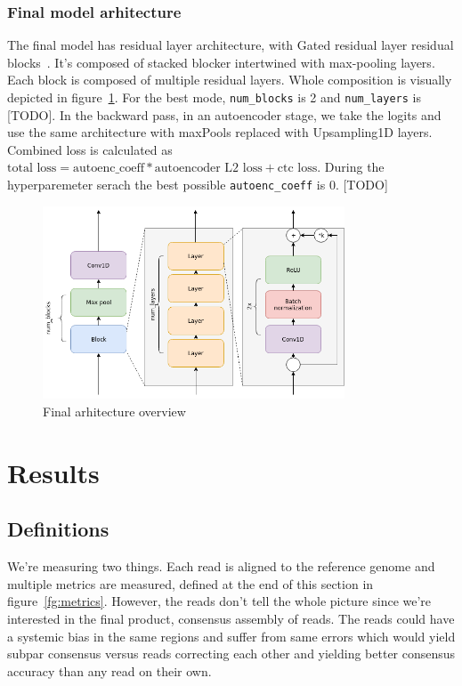 \documentclass[times, utf8, diplomski, english]{fer}
\begin{document}
\subsection{Final model arhitecture}
\label{subsec:final-model-architecture}

The final model has residual layer architecture, with Gated residual layer residual blocks~\citep{resnet,DBLP:journals/corr/Savarese16}. 
It's composed of stacked blocker intertwined with max-pooling layers.
Each block is composed of multiple residual layers. 
Whole composition is visually depicted in figure~\ref{fg:final_arch}.
For the best mode, \texttt{num\_blocks} is 2 and \texttt{num\_layers} is [TODO].
In the backward pass, in an autoencoder stage, we take the logits and use the same architecture with maxPools replaced with Upsampling1D layers.
Combined loss is calculated as $\text{total loss} = \text{autoenc\_coeff} * \text{autoencoder L2 loss} + \text{ctc loss}$.
During the hyperparemeter serach the best possible \texttt{autoenc\_coeff} is 0.  [TODO]

\begin{figure}
    \begin{center}
        \includegraphics[width=0.8\textwidth]{final_arch}
        \caption{Final arhitecture overview}
        \label{fg:final_arch}
    \end{center}
\end{figure}

\chapter{Results}
\label{chap:results}

\section{Definitions}
We're measuring two things. Each read is aligned to the reference genome and multiple metrics are measured, defined at the end of this section in figure~\ref{fg:metrics}. However, the reads don't tell the whole picture since we're interested in the final product, consensus assembly of reads. The reads could have a systemic bias in the same regions and suffer from same errors which would yield subpar consensus versus reads correcting each other and yielding better consensus accuracy than any read on their own.
\end{document}
